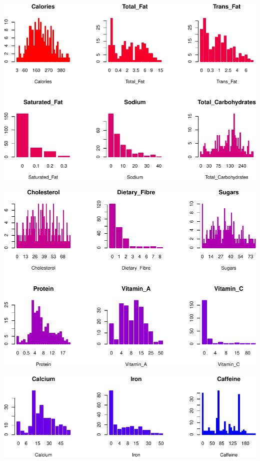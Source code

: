 \documentclass[
]{article}
\begin{document}
\begin{center}\includegraphics{Statistical_Learning_Final_Report_files/figure-latex/barplot-1} \end{center}

\begin{center}\includegraphics{Statistical_Learning_Final_Report_files/figure-latex/barplot-2} \end{center}

\begin{center}\includegraphics{Statistical_Learning_Final_Report_files/figure-latex/barplot-3} \end{center}
\end{document}
